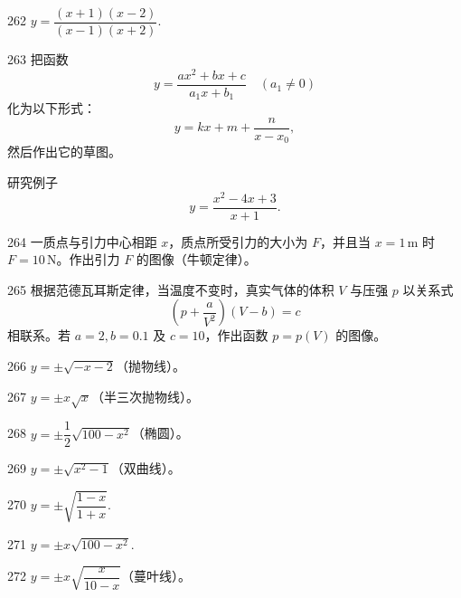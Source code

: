 \begin{prob}[S]{262}
$y = \dfrac{(x + 1)(x - 2)}{(x - 1)(x + 2)}$.
\end{prob}

\begin{prob}[M]{263}
把函数
\[
y = \frac{ax^2 + bx + c}{a_1 x + b_1} \quad (a_1 \neq 0)
\]
化为以下形式：
\[
y = kx + m + \frac{n}{x - x_0},
\]
然后作出它的草图。

研究例子
\[
y = \frac{x^2 - 4x + 3}{x + 1}.
\]
\end{prob}

\begin{prob}[M]{264}
一质点与引力中心相距 $x$，质点所受引力的大小为 $F$，并且当 $x = 1\,\mathrm{m}$ 时 $F = 10\,\mathrm{N}$。作出引力 $F$ 的图像（牛顿定律）。
\end{prob}

\begin{prob}[M]{265}
根据范德瓦耳斯定律，当温度不变时，真实气体的体积 $V$ 与压强 $p$ 以关系式
\[
\left(p + \frac{a}{V^2}\right)(V - b) = c
\]
相联系。若 $a = 2, b = 0.1$ 及 $c = 10$，作出函数 $p = p(V)$ 的图像。
\end{prob}


\begin{prob}[S]{266}
$y = \pm\sqrt{-x - 2}$（抛物线）。
\end{prob}

\begin{prob}[S]{267}
$y = \pm x\sqrt{x}$（半三次抛物线）。
\end{prob}

\begin{prob}[S]{268}
$y = \pm\dfrac{1}{2}\sqrt{100 - x^2}$（椭圆）。
\end{prob}

\begin{prob}[S]{269}
$y = \pm\sqrt{x^2 - 1}$（双曲线）。
\end{prob}

\begin{prob}[S]{270}
$y = \pm\sqrt{\dfrac{1 - x}{1 + x}}$.
\end{prob}

\begin{prob}[S]{271}
$y = \pm x\sqrt{100 - x^2}$.
\end{prob}

\begin{prob}[S]{272}
$y = \pm x\sqrt{\dfrac{x}{10 - x}}$（蔓叶线）。
\end{prob}

